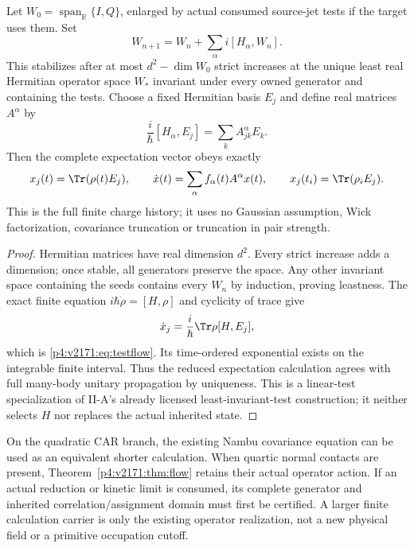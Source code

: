 \documentclass[12pt,a4paper]{article}
\begin{document}
\begin{theorem}\label{p4:v2171:thm:flow}
Let $W_0=\operatorname{span}_{\mathbb R}\{I,Q\}$, enlarged by actual
consumed source-jet tests if the target uses them. Set
\[
 W_{n+1}=W_n+\sum_\alpha i[H_\alpha,W_n].
\]
This stabilizes after at most $d^2-\dim W_0$ strict increases at the unique
least real Hermitian operator space $W_*$ invariant under every owned
generator and containing the tests. Choose a fixed Hermitian basis $E_j$ and
define real matrices $A^\alpha$ by
\[
 \frac{i}{\hbar}[H_\alpha,E_j]
       =\sum_k A^\alpha_{jk}E_k.
\]
Then the complete expectation vector obeys exactly
\begin{equation}\label{p4:v2171:eq:testflow}
 x_j(t)=\Tr(\rho(t)E_j),\qquad
 \dot x(t)=\sum_\alpha f_\alpha(t)A^\alpha x(t),\qquad
 x_j(t_i)=\Tr(\rho_iE_j).
\end{equation}
This is the full finite charge history; it uses no Gaussian assumption,
Wick factorization, covariance truncation or truncation in pair strength.
\end{theorem}
\begin{proof}
Hermitian matrices have real dimension $d^2$. Every strict increase adds
a dimension; once stable, all generators preserve the space. Any other
invariant space containing the seeds contains every $W_n$ by induction,
proving leastness. The exact finite equation
$i\hbar\dot\rho=[H,\rho]$ and cyclicity of trace give
\[
 \dot x_j=\frac{i}{\hbar}\Tr\rho[H,E_j],
\]
which is \eqref{p4:v2171:eq:testflow}. Its time-ordered exponential exists on the
integrable finite interval. Thus the reduced expectation calculation agrees
with full many-body unitary propagation by uniqueness. This is a linear-test
specialization of II-A's already licensed least-invariant-test construction;
it neither selects $H$ nor replaces the actual inherited state.
\end{proof}

On the quadratic CAR branch, the existing Nambu covariance equation can be
used as an equivalent shorter calculation. When quartic normal contacts are
present, Theorem~\ref{p4:v2171:thm:flow} retains their actual operator action.
If an actual reduction or kinetic limit is consumed, its complete generator
and inherited correlation/assignment domain must first be certified. A
larger finite calculation carrier is only the existing operator realization,
not a new physical field or a primitive occupation cutoff.
\end{document}

